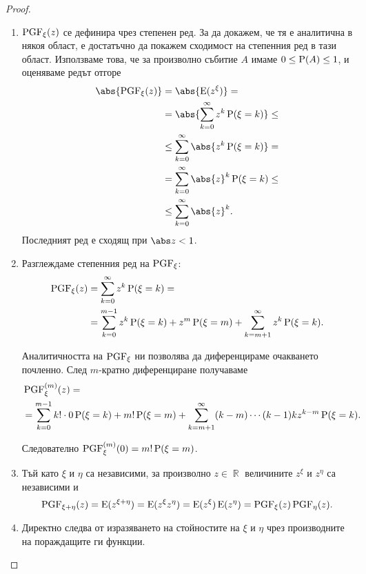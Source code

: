\documentclass{../../common/topic}
\begin{document}
\begin{proof}
  \hfill
  \begin{enumerate}
    \item \( \operatorname{PGF}_\xi(z) \) се дефинира чрез степенен ред. За да докажем, че тя е аналитична в някоя област, е достатъчно да покажем сходимост на степенния ред в тази област. Използваме това, че за произволно събитие \( A \) имаме \( 0 \leq \operatorname{P}(A) \leq 1 \), и оценяваме редът отгоре
    \begin{align*}
      \abs{\PGF_\xi(z)}
      &=
      \abs{\Expect(z^\xi)}
      = \\ &=
      \abs{\sum_{k=0}^\infty z^k \Prob(\xi = k)}
      \leq \\ &\leq
      \sum_{k=0}^\infty \abs{z^k \Prob(\xi = k)}
      = \\ &=
      \sum_{k=0}^\infty \abs{z}^k \Prob(\xi = k)
      \leq \\ &\leq
      \sum_{k=0}^\infty \abs{z}^k.
    \end{align*}
    Последният ред е сходящ при \( \abs z < 1 \).

    \item Разглеждаме степенния ред на \( \operatorname{PGF}_\xi \):
    \begin{align*}
      \operatorname{PGF}_\xi(z)
      &=
      \sum_{k=0}^\infty z^k \operatorname{P}(\xi = k)
      = \\ &=
      \sum_{k=0}^{m-1} z^k \operatorname{P}(\xi = k) + z^m \operatorname{P}(\xi = m) + \sum_{k=m+1}^\infty z^k \operatorname{P}(\xi = k).
    \end{align*}

    Аналитичността на \( \operatorname{PGF}_\xi \) ни позволява да диференцираме очакването почленно. След \( m \)-кратно диференциране получаваме
    \begin{align*}
      &\operatorname{PGF}_\xi^{(m)}(z)
      = \\ &=
      \sum_{k=0}^{m-1} k! \cdot 0 \operatorname{P}(\xi = k) + m! \operatorname{P}(\xi = m) + \sum_{k=m+1}^\infty (k-m) \cdots (k-1) k z^{k-m} \operatorname{P}(\xi = k).
    \end{align*}

    Следователно \( \operatorname{PGF}_\xi^{(m)}(0) = m! \operatorname{P}(\xi = m) \).

    \item Тъй като \( \xi \) и \( \eta \) са независими, за произволно \( z \in \BbbR \) величините \( z^\xi \) и \( z^\eta \) са независими и
    \begin{equation*}
      \operatorname{PGF}_{\xi + \eta}(z)
      =
      \operatorname{E}(z^{\xi + \eta})
      =
      \operatorname{E}(z^\xi z^\eta)
      =
      \operatorname{E}(z^\xi) \operatorname{E}(z^\eta)
      =
      \operatorname{PGF}_\xi(z) \operatorname{PGF}_\eta(z).
    \end{equation*}

    \item Директно следва от изразяването на стойностите на \( \xi \) и \( \eta \) чрез производните на пораждащите ги функции.
  \end{enumerate}
\end{proof}
\end{document}
